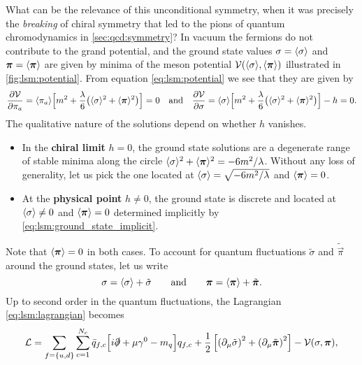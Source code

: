 What can be the relevance of this unconditional symmetry,
when it was precisely the \emph{breaking} of chiral symmetry that led to the pions of quantum chromodynamics in \cref{sec:qcd:symmetry}?
In vacuum the fermions do not contribute to the grand potential,
and the ground state values $\sigma = \langle \sigma \rangle$ and ${\bm{\pi}} = \langle {\bm{\pi}} \rangle$ are given by minima of the meson potential $\mathcal{V}(\langle \sigma \rangle,\langle {\bm{\pi}} \rangle)$ illustrated in \cref{fig:lsm:potential}.
From equation \eqref{eq:lsm:potential} we see that they are given by
\begin{equation}
	\pdv{\mathcal{V}}{\pi_a} = \langle \pi_a \rangle \Big[ m^2 + \frac{\lambda}{6} \big(\langle \sigma \rangle^2 + \langle {\bm{\pi}} \rangle^2\big) \Big] = 0
	\quad \text{and} \quad
	\pdv{\mathcal{V}}{\sigma} = \langle \sigma \rangle \Big[ m^2 + \frac{\lambda}{6} \big(\langle \sigma \rangle^2 + \langle {\bm{\pi}} \rangle^2\big) \Big] - h = 0.
\label{eq:lsm:ground_state_implicit}
\end{equation}
The qualitative nature of the solutions depend on whether $h$ vanishes.
\begin{itemize}
\item In the \textbf{chiral limit} $h=0$,
      the ground state solutions are a degenerate range of stable minima along the circle $\langle \sigma \rangle^2+\langle {\bm{\pi}} \rangle^2=-6m^2/\lambda$.
      Without any loss of generality, let us pick the one located at $\langle \sigma \rangle = \sqrt{-6m^2/\lambda}$ and $\langle {\bm{\pi}} \rangle=0$.
\item At the \textbf{physical point} $h \neq 0$,
      the ground state is discrete and located at $\langle \sigma \rangle \neq 0$ and $\langle {\bm{\pi}} \rangle=0$ determined implicitly by \eqref{eq:lsm:ground_state_implicit}.
\end{itemize}
Note that $\langle {\bm{\pi}} \rangle = 0$ in both cases.
To account for quantum fluctuations $\tilde{\sigma}$ and $\tilde{\vec{\pi}}$ around the ground states, let us write
\begin{equation}
	\sigma = \langle \sigma \rangle + \tilde{\sigma}
	\qquad \text{and} \qquad
	{\bm{\pi}} = \langle {\bm{\pi}} \rangle + \tilde{{\bm{\pi}}}.
\end{equation}
Up to second order in the quantum fluctuations,
the Lagrangian \eqref{eq:lsm:lagrangian} becomes
\begin{equation}
	\lagr = \sum_{f=\{u,d\}} \sum_{c=1}^{N_c} \bar{q}_{f,c} \Big[ i \slashed\partial + \mu \gamma^0 - m_q \Big] q_{f,c}
	      + \frac12 \left[ \left( \partial_\mu \tilde{\sigma} \right)^2 + \left( \partial_\mu \tilde{\vec\pi} \right)^2 \right] - \pot(\sigma,\vec\pi) , %
\end{equation}
